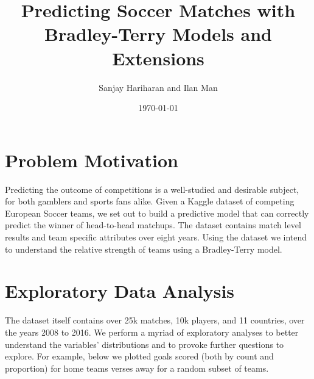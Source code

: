 \documentclass{article}
\title{Predicting Soccer Matches with Bradley-Terry Models and Extensions}
\author{Sanjay Hariharan and Ilan Man}
\date{\today}
\begin{document}
\maketitle

\section{Problem Motivation}

Predicting the outcome of competitions is a well-studied and desirable subject, for both gamblers and sports fans alike. Given a Kaggle dataset of competing European Soccer teams, we set out to build a predictive model that can correctly predict the winner of head-to-head matchups. The dataset contains match level results and team specific attributes over eight years. Using the dataset we intend to understand the relative strength of teams using a Bradley-Terry model. 

\section{Exploratory Data Analysis}

The dataset itself contains over 25k matches, 10k players, and 11 countries, over the years 2008 to 2016. We perform a myriad of exploratory analyses to better understand the variables' distributions and to provoke further questions to explore. For example, below we plotted goals scored (both by count and proportion) for home teams verses away for a random subset of teams. \\
\end{document}
